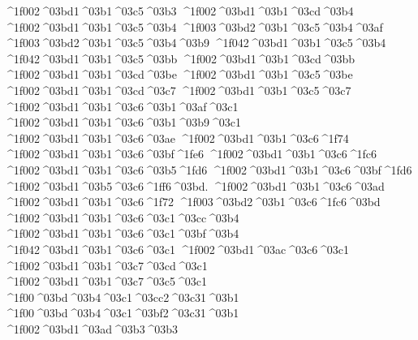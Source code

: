 {^^^^1f002^^^^03bd1^^^^03b1^^^^03c5^^^^03b3
^^^^1f002^^^^03bd1^^^^03b1^^^^03cd^^^^03b4 		%
^^^^1f002^^^^03bd1^^^^03b1^^^^03c5^^^^03b4
	^^^^1f003^^^^03bd2^^^^03b1^^^^03c5^^^^03b4^^^^03af 		%
	^^^^1f003^^^^03bd2^^^^03b1^^^^03c5^^^^03b4^^^^03b9
^^^^1f042^^^^03bd1^^^^03b1^^^^03c5^^^^03b4 		%
^^^^1f042^^^^03bd1^^^^03b1^^^^03c5^^^^03bb 		%
^^^^1f002^^^^03bd1^^^^03b1^^^^03cd^^^^03bb
^^^^1f002^^^^03bd1^^^^03b1^^^^03cd^^^^03be 		%
^^^^1f002^^^^03bd1^^^^03b1^^^^03c5^^^^03be 
^^^^1f002^^^^03bd1^^^^03b1^^^^03cd^^^^03c7 		%
^^^^1f002^^^^03bd1^^^^03b1^^^^03c5^^^^03c7
^^^^1f002^^^^03bd1^^^^03b1^^^^03c6^^^^03b1^^^^03af^^^^03c1 		%
^^^^1f002^^^^03bd1^^^^03b1^^^^03c6^^^^03b1^^^^03b9^^^^03c1
^^^^1f002^^^^03bd1^^^^03b1^^^^03c6^^^^03ae		%
^^^^1f002^^^^03bd1^^^^03b1^^^^03c6^^^^1f74 
^^^^1f002^^^^03bd1^^^^03b1^^^^03c6^^^^03bf^^^^1fe6
^^^^1f002^^^^03bd1^^^^03b1^^^^03c6^^^^1fc6		
^^^^1f002^^^^03bd1^^^^03b1^^^^03c6^^^^03b5^^^^1fd6
^^^^1f002^^^^03bd1^^^^03b1^^^^03c6^^^^03bf^^^^1fd6 
^^^^1f002^^^^03bd1^^^^03b5^^^^03c6^^^^1ff6^^^^03bd.
^^^^1f002^^^^03bd1^^^^03b1^^^^03c6^^^^03ad
^^^^1f002^^^^03bd1^^^^03b1^^^^03c6^^^^1f72
	^^^^1f003^^^^03bd2^^^^03b1^^^^03c6^^^^1fc6^^^^03bd		%
^^^^1f002^^^^03bd1^^^^03b1^^^^03c6^^^^03c1^^^^03cc^^^^03b4 		%
^^^^1f002^^^^03bd1^^^^03b1^^^^03c6^^^^03c1^^^^03bf^^^^03b4
^^^^1f042^^^^03bd1^^^^03b1^^^^03c6^^^^03c1    		%
^^^^1f002^^^^03bd1^^^^03ac^^^^03c6^^^^03c1
^^^^1f002^^^^03bd1^^^^03b1^^^^03c7^^^^03cd^^^^03c1 		%
^^^^1f002^^^^03bd1^^^^03b1^^^^03c7^^^^03c5^^^^03c1
^^^^1f00^^^^03bd^^^^03b4^^^^03c1^^^^03cc2^^^^03c31^^^^03b1 		%
^^^^1f00^^^^03bd^^^^03b4^^^^03c1^^^^03bf2^^^^03c31^^^^03b1
^^^^1f002^^^^03bd1^^^^03ad^^^^03b3^^^^03b3 		%
}
